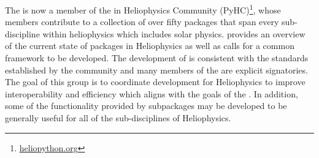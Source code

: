 The \sunpyproj is now a member of the \python in Heliophysics Community (PyHC)\footnote{\url{heliopython.org}}, whose members contribute to a collection of over fifty \python packages that span every sub-discipline within heliophysics which includes solar physics.
\citet{snakes} provides an overview of the current state of \python packages in Heliophysics as well as calls for a common framework to be developed.
The development of \sunpypkg is consistent with the standards established by the community \citep{pyhcStandards} and many members of the \sunpyproj are explicit signatories.
The goal of this group is to coordinate \python development for Heliophysics to improve interoperability and efficiency which aligns with the goals of the \sunpyproj.
In addition, some of the functionality provided by \sunpypkg subpackages may be developed to be generally useful for all of the sub-disciplines of Heliophysics.
